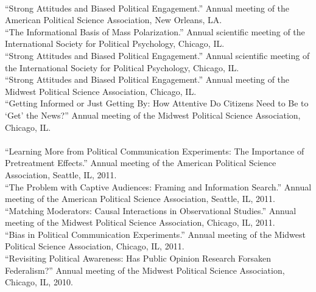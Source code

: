 \documentclass[12pt]{article}
\newcommand{\topic}[1]{\pagebreak[3]\indent {\color{lg}{\footnotesize #1 }}\\}
\newcommand{\entry}[1]{\indent {\color{lg}\guillemotright}\hspace{2pt}#1\vspace{.25em}\\}
\begin{document}
	\topic{Conference Papers (2012)}
	\entry{``Strong Attitudes and Biased Political Engagement.'' Annual meeting of the American Political Science Association, New Orleans, LA.}
	\entry{``The Informational Basis of Mass Polarization.'' Annual scientific meeting of the International Society for Political Psychology, Chicago, IL.}
	\entry{``Strong Attitudes and Biased Political Engagement.'' Annual scientific meeting of the International Society for Political Psychology, Chicago, IL.}
	\entry{``Strong Attitudes and Biased Political Engagement.'' Annual meeting of the Midwest Political Science Association, Chicago, IL.}
	\entry{``Getting Informed or Just Getting By: How Attentive Do Citizens Need to Be to `Get' the News?'' Annual meeting of the Midwest Political Science Association, Chicago, IL.}
	
	\topic{Conference Papers (2011 and earlier)}
	\entry{``Learning More from Political Communication Experiments: The Importance of Pretreatment Effects.'' Annual meeting of the American Political Science Association, Seattle, IL, 2011.}
	\entry{``The Problem with Captive Audiences: Framing and Information Search.'' Annual meeting of the American Political Science Association, Seattle, IL, 2011.}
	\entry{``Matching Moderators: Causal Interactions in Observational Studies.'' Annual meeting of the Midwest Political Science Association, Chicago, IL, 2011.}
	\entry{``Bias in Political Communication Experiments.'' Annual meeting of the Midwest Political Science Association, Chicago, IL, 2011.}
	\entry{``Revisiting Political Awareness: Has Public Opinion Research Forsaken Federalism?'' Annual meeting of the Midwest Political Science Association, Chicago, IL, 2010.}
\end{document}
